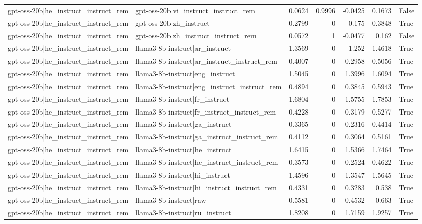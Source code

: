\begin{table}
\begin{tabular}{l l r r r r l}
gpt-oss-20b|he_instruct_instruct_rem & gpt-oss-20b|vi_instruct_instruct_rem & 0.0624 & 0.9996 & -0.0425 & 0.1673 & False \\
gpt-oss-20b|he_instruct_instruct_rem & gpt-oss-20b|zh_instruct & 0.2799 & 0 & 0.175 & 0.3848 & True \\
gpt-oss-20b|he_instruct_instruct_rem & gpt-oss-20b|zh_instruct_instruct_rem & 0.0572 & 1 & -0.0477 & 0.162 & False \\
gpt-oss-20b|he_instruct_instruct_rem & llama3-8b-instruct|ar_instruct & 1.3569 & 0 & 1.252 & 1.4618 & True \\
gpt-oss-20b|he_instruct_instruct_rem & llama3-8b-instruct|ar_instruct_instruct_rem & 0.4007 & 0 & 0.2958 & 0.5056 & True \\
gpt-oss-20b|he_instruct_instruct_rem & llama3-8b-instruct|eng_instruct & 1.5045 & 0 & 1.3996 & 1.6094 & True \\
gpt-oss-20b|he_instruct_instruct_rem & llama3-8b-instruct|eng_instruct_instruct_rem & 0.4894 & 0 & 0.3845 & 0.5943 & True \\
gpt-oss-20b|he_instruct_instruct_rem & llama3-8b-instruct|fr_instruct & 1.6804 & 0 & 1.5755 & 1.7853 & True \\
gpt-oss-20b|he_instruct_instruct_rem & llama3-8b-instruct|fr_instruct_instruct_rem & 0.4228 & 0 & 0.3179 & 0.5277 & True \\
gpt-oss-20b|he_instruct_instruct_rem & llama3-8b-instruct|ga_instruct & 0.3365 & 0 & 0.2316 & 0.4414 & True \\
gpt-oss-20b|he_instruct_instruct_rem & llama3-8b-instruct|ga_instruct_instruct_rem & 0.4112 & 0 & 0.3064 & 0.5161 & True \\
gpt-oss-20b|he_instruct_instruct_rem & llama3-8b-instruct|he_instruct & 1.6415 & 0 & 1.5366 & 1.7464 & True \\
gpt-oss-20b|he_instruct_instruct_rem & llama3-8b-instruct|he_instruct_instruct_rem & 0.3573 & 0 & 0.2524 & 0.4622 & True \\
gpt-oss-20b|he_instruct_instruct_rem & llama3-8b-instruct|hi_instruct & 1.4596 & 0 & 1.3547 & 1.5645 & True \\
gpt-oss-20b|he_instruct_instruct_rem & llama3-8b-instruct|hi_instruct_instruct_rem & 0.4331 & 0 & 0.3283 & 0.538 & True \\
gpt-oss-20b|he_instruct_instruct_rem & llama3-8b-instruct|raw & 0.5581 & 0 & 0.4532 & 0.663 & True \\
gpt-oss-20b|he_instruct_instruct_rem & llama3-8b-instruct|ru_instruct & 1.8208 & 0 & 1.7159 & 1.9257 & True \\

\end{tabular}
\end{table}

